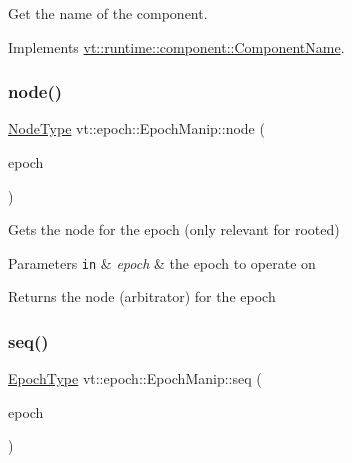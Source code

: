 Get the name of the component. 



Implements \hyperlink{structvt_1_1runtime_1_1component_1_1_component_name_a33c06229bb605a2b2ceff68830d6d773}{vt\+::runtime\+::component\+::\+Component\+Name}.

\mbox{\label{structvt_1_1epoch_1_1_epoch_manip_a7120f73ef583ab8f061334fc0bc519c3}} 
\subsubsection{\texorpdfstring{node()}{node()}}
{\footnotesize\ttfamily \hyperlink{namespacevt_a866da9d0efc19c0a1ce79e9e492f47e2}{Node\+Type} vt\+::epoch\+::\+Epoch\+Manip\+::node (\begin{DoxyParamCaption}\item[{\hyperlink{namespacevt_a985a5adf291c34a3ca263b3378388236}{Epoch\+Type} const \&}]{epoch }\end{DoxyParamCaption})\hspace{0.3cm}{\ttfamily [static]}}



Gets the node for the epoch (only relevant for rooted) 


\begin{DoxyParams}[1]{Parameters}
\mbox{\tt in}  & {\em epoch} & the epoch to operate on\\
\hline
\end{DoxyParams}
\begin{DoxyReturn}{Returns}
the node (arbitrator) for the {\ttfamily epoch} 
\end{DoxyReturn}
\mbox{\label{structvt_1_1epoch_1_1_epoch_manip_ac34685702f19dde2f5bc25fcb43ec038}} 
\subsubsection{\texorpdfstring{seq()}{seq()}}
{\footnotesize\ttfamily \hyperlink{namespacevt_a985a5adf291c34a3ca263b3378388236}{Epoch\+Type} vt\+::epoch\+::\+Epoch\+Manip\+::seq (\begin{DoxyParamCaption}\item[{\hyperlink{namespacevt_a985a5adf291c34a3ca263b3378388236}{Epoch\+Type} const \&}]{epoch }\end{DoxyParamCaption})\hspace{0.3cm}{\ttfamily [static]}}




